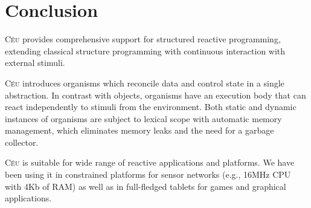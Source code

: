 \documentclass{acm_proc_article-sp}
\newcommand{\CEU}{\textsc{C\'{e}u}\xspace}
\newcommand{\1}{\;}
\newcommand{\2}{\;\;}
\newcommand{\3}{\;\;\;}
\newcommand{\5}{\;\;\;\;\;}
\begin{document}
\section{Conclusion}
\label{sec.conclusion}

\CEU provides comprehensive support for structured reactive programming, 
extending classical structure programming with continuous interaction with
external stimuli.

\CEU introduces organisms which reconcile data and control state in a single 
abstraction.
%
In contrast with objects, organisms have an execution body that can react 
independently to stimuli from the environment.
%
Both static and dynamic instances of organisms are subject to lexical scope 
with automatic memory management, which eliminates memory leaks and the need 
for a garbage collector.

\CEU is suitable for wide range of reactive applications and platforms.
%
We have been using it in constrained platforms for sensor networks (e.g., 16MHz 
CPU with 4Kb of RAM) as well as in full-fledged tablets for games and graphical 
applications.




\end{document}
